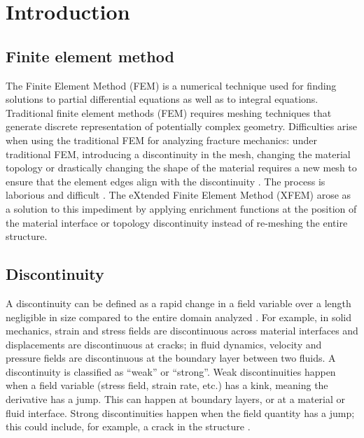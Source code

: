 \section{Introduction}
\label{introduction}


\subsection{Finite element method}

The Finite Element Method (FEM) is a numerical technique used for finding solutions to partial differential equations as well as to integral equations. Traditional finite element methods (FEM) requires meshing techniques that generate discrete representation of potentially complex geometry. Difficulties arise when using the traditional FEM for analyzing fracture mechanics: under traditional FEM, introducing a discontinuity in the mesh, changing the material topology or drastically changing the shape of the material requires a new mesh to ensure that the element edges align with the discontinuity \citep{AH:08}. The process is laborious and difficult \citep{ZTZ:05}. The eXtended Finite Element Method (XFEM) arose as a solution to this impediment by applying enrichment functions at the position of the material interface or topology discontinuity instead of re-meshing the entire structure.


\subsection{Discontinuity}

A discontinuity can be defined as a rapid change in a field variable over a length negligible in size compared to the entire domain analyzed \citep{AH:08}. For example, in solid mechanics, strain and stress fields are discontinuous across material interfaces and displacements are discontinuous at cracks; in fluid dynamics, velocity and pressure fields are discontinuous at the boundary layer between two fluids. A discontinuity is classified as ``weak'' or ``strong''. Weak discontinuities happen when a field variable (stress field, strain rate, etc.) has a kink, meaning the derivative has a jump. This can happen at boundary layers, or at a material or fluid interface. Strong discontinuities happen when the field quantity has a jump; this could include, for example, a crack in the structure \citep{HH:04b}.

